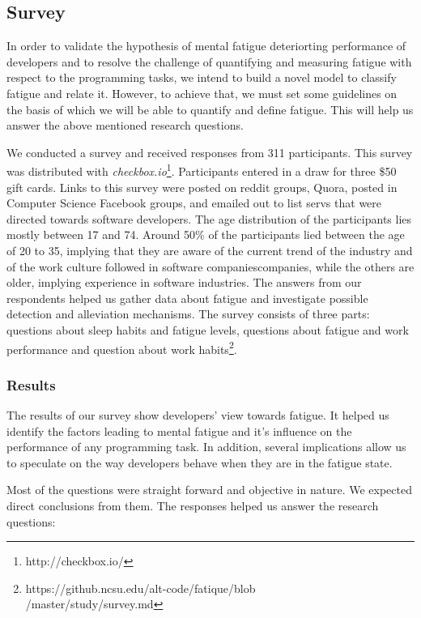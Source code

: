 \documentclass{acm_proc_article-sp}
\begin{document}
\subsection{Survey}
In order to validate the hypothesis of mental fatigue deteriorting
performance of developers and to resolve the challenge of
quantifying and measuring fatigue with respect to the programming tasks, we
intend to build a novel model to classify fatigue and relate it. However, to
achieve that, we must set some guidelines on the basis of which we will be able
to quantify and define fatigue. This will help us answer the above mentioned
research questions.

We conducted a survey and received responses from 311 participants. This survey
was distributed with \textit{checkbox.io}\footnote{http://checkbox.io/}.
Participants entered in a draw for three \$50 gift cards. Links to this
survey were posted on reddit groups, Quora, posted in Computer Science Facebook
groups, and emailed out to list servs that were directed towards software developers.
The age distribution of the participants lies mostly between 17 and 74. Around
50\% of the participants lied between the age of 20 to 35, implying that they
are aware of the current trend of the industry and of the work culture followed in
software companiescompanies, while the others are older, implying experience in
software industries. The answers from our respondents helped us gather data
about fatigue and investigate possible detection and alleviation mechanisms. The
survey consists of three parts: questions about sleep habits and fatigue levels,
questions about fatigue and work performance and question about work
habits\footnote{https://github.ncsu.edu/alt-code/fatique/blob\\/master/study/survey.md}.
  
\subsubsection{Results}
The results of our survey show developers' view towards fatigue. It helped
us identify the factors leading to mental fatigue and it's influence on the
performance of any programming task. In addition, several implications allow us
to speculate on the way developers behave when they are in the fatigue state.

Most of the questions were straight forward and objective in nature. We expected
direct conclusions from them. The responses helped us answer the research questions:
\end{document}
